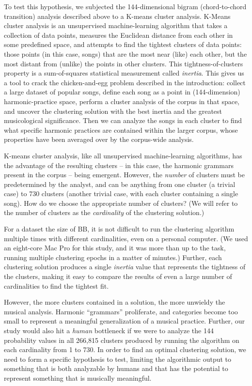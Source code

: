 To test this hypothesis, we subjected the 144-dimensional bigram (chord-to-chord transition) analysis described above to a K-means cluster analysis. K-Means cluster analysis is an unsupervised machine-learning algorithm that takes a collection of data points, measures the Euclidean distance from each other in some predefined space, and attempts to find the tightest clusters of data points: those points (in this case, songs) that are the most near (like) each other, but the most distant from (unlike) the points in other clusters. This tightness-of-clusters property is a sum-of-squares statistical measurement called \emph{inertia}. This gives us a tool to crack the chicken-and-egg problem described in the introduction: collect a large dataset of popular songs, define each song as a point in (144-dimension) harmonic-practice space, perform a cluster analysis of the corpus in that space, and uncover the clustering solution with the best inertia and the greatest musicological significance. Then we can analyze the songs in each cluster to find what specific harmonic practices are contained within the larger corpus, whose properties have been averaged over by the corpus-wide analysis.

K-means cluster analysis, like all unsupervised machine-learning algorithms, has the advantage of the resulting clusters -- in this case, the harmonic grammars present in the corpus -- being emergent. However, the \emph{number} of clusters must be predetermined by the analyst, and can be anything from one cluster (a trivial case) to 730 clusters (another trivial case, with each cluster containing a single song). How do we choose the appropriate number of clusters? (We will refer to the number of clusters as the \emph{cardinality} of the clustering solution.)

For a dataset the size of BB, it is not difficult to run the clustering algorithm multiple times with different cardinalities, even on a personal computer. (We used an eight-core Mac Pro for this study, and it was more than up to the task, running multiple clustering epochs in a matter of minutes.) Further, each clustering solution produces a single \emph{inertia} value that represents the tightness of the clusters, making it easy to compare the results of even a large number of cardinalities to find the tightest fit.

However, the more clusters contained in a solution, the more unwieldy the musical analysis. Harmonic ``grammars'' proliferate, and categories become too small to represent a meaningful generalization of a musical practice. Further, our study would also hit a \emph{human} bottleneck if we were to analyze the 144 probability values in all 266,815 clusters produced by running the algorithm on each cardinality from 1 to 730. In order to find an optimal clustering solution, we need to form a specific hypothesis to test, limiting the algorithmic output to something that is both analyzable by humans and that has the potential to represent something that is musically meaningful.

